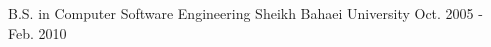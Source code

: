


\begin{cventries}


\cventry
{B.S. in Computer Software Engineering} %
{Sheikh Bahaei University} %
{} %
{Oct. 2005 - Feb. 2010} %
{ %
}


\end{cventries}